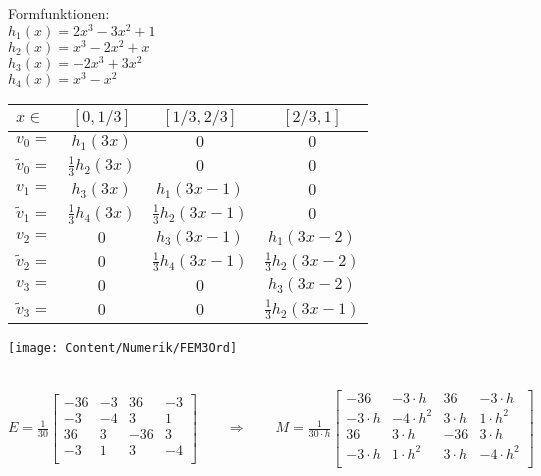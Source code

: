 \begin{minipage}{4cm}
	Formfunktionen:\\
	$h_1(x)=2x^3-3x^2+1$\\
	$h_2(x)=x^3-2x^2+x$\\
	$h_3(x)=-2x^3+3x^2$\\
	$h_4(x)=x^3-x^2$
\end{minipage}
\hfill
\begin{minipage}{8cm}
	\begin{tabular}{lc|c|c}
		$x\in$         & $[0,1/3]$          & $[1/3,2/3]$          & $[2/3,1]$            \\
		\hline
		$v_0=$         & $h_1(3x)$          & $0$                  & $0$                  \\
		$\tilde{v}_0=$ & $\frac 13 h_2(3x)$ & $0$                  & $0$                  \\
		$v_1=$         & $h_3(3x)$          & $h_1(3x-1)$          & $0$                  \\
		$\tilde{v}_1=$ & $\frac 13 h_4(3x)$ & $\frac 13 h_2(3x-1)$ & $0$                  \\
		$v_2=$         & $0$                & $h_3(3x-1)$          & $h_1(3x-2)$          \\
		$\tilde{v}_2=$ & $0$                & $\frac 13 h_4(3x-1)$ & $\frac 13 h_2(3x-2)$ \\
		$v_3=$         & $0$                & $0$                  & $h_3(3x-2)$          \\
		$\tilde{v}_3=$ & $0$                & $0$                  & $\frac 13 h_2(3x-1)$ \\
	\end{tabular}
\end{minipage}
\hfill
\begin{minipage}{6cm}
	\texttt{[image: Content/Numerik/FEM3Ord]}
\end{minipage}\\
$E=\frac{1}{30}
	\begin{bmatrix}
		-36 & -3 & 36  & -3 \\
		-3  & -4 & 3   & 1  \\
		36  & 3  & -36 & 3  \\
		-3  & 1  & 3   & -4 \\
	\end{bmatrix}\qquad\Rightarrow\qquad
	\boxed{M=\frac{1}{30\cdot h}
		\begin{bmatrix}
			-36       & -3\cdot h   & 36       & -3\cdot h   \\
			-3\cdot h & -4\cdot h^2 & 3\cdot h & 1\cdot h^2  \\
			36        & 3\cdot h    & -36      & 3\cdot h    \\
			-3\cdot h & 1\cdot h^2  & 3\cdot h & -4\cdot h^2 \\
		\end{bmatrix}}$\\
\\


